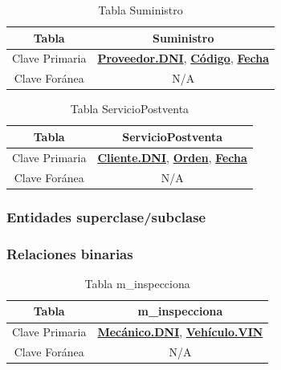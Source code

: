 \documentclass[12pt]{article}
\begin{document}
\begin{table}[htbp]
\begin{center}
\begin{tabular}{|c|c|}
\hline
Tabla & Suministro \\
\hline
Clave Primaria & \textbf{\underline{Proveedor.DNI}}, \textbf{\underline{Código}}, \textbf{\underline{Fecha}} \\
\hline
Clave Foránea & N/A \\
\hline
\end{tabular}
\caption{Tabla Suministro}
\label{tab:tablas}
\end{center}
\end{table}


\begin{table}[htbp]
\begin{center}
\begin{tabular}{|c|c|}
\hline
Tabla & ServicioPostventa \\
\hline
Clave Primaria & \textbf{\underline{Cliente.DNI}}, \textbf{\underline{Orden}}, \textbf{\underline{Fecha}} \\
\hline
Clave Foránea & N/A \\
\hline
\end{tabular}
\caption{Tabla ServicioPostventa}
\label{tab:tablas}
\end{center}
\end{table}



\subsubsection{Entidades superclase/subclase}



\subsubsection{Relaciones binarias}

\begin{table}[htbp]
\begin{center}
\begin{tabular}{|c|c|}
\hline
Tabla & m\_inspecciona \\
\hline
Clave Primaria & \textbf{\underline{Mecánico.DNI}}, \textbf{\underline{Vehículo.VIN}} \\
\hline
Clave Foránea & N/A \\
\hline
\end{tabular}
\caption{Tabla m\_inspecciona}
\label{tab:tablas}
\end{center}
\end{table}
\end{document}
